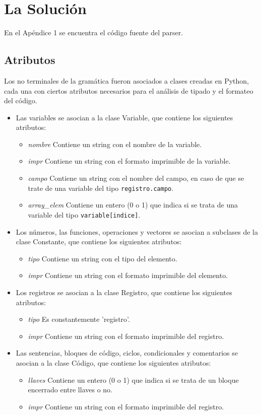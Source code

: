 \section{La Solución}

En el Apéndice 1 se encuentra el código fuente del parser.

\subsection{Atributos}

Los no terminales de la gramática fueron asociados a clases creadas en Python, cada una con ciertos atributos necesarios para el análisis de tipado y el formateo del código.

\begin{itemize}
\item Las variables se asocian a la clase Variable, que contiene los siguientes atributos:
	\begin{itemize}
	\item {\it nombre} Contiene un string con el nombre de la variable.
	\item {\it impr} Contiene un string con el formato imprimible de la variable.
	\item {\it campo} Contiene un string con el nombre del campo, en caso de que se trate de una variable del tipo {\tt registro.campo}.
	\item {\it array_elem} Contiene un entero (0 o 1) que indica si se trata de una variable del tipo {\tt variable[indice]}.
	\end{itemize}
\item Los números, las funciones, operaciones y vectores se asocian a subclases de la clase Constante, que contiene los siguientes atributos:
	\begin{itemize}
	\item {\it tipo} Contiene un string con el tipo del elemento.
	\item {\it impr} Contiene un string con el formato imprimible del elemento.
	\end{itemize}
\item Los registros se asocian a la clase Registro, que contiene los siguientes atributos:
	\begin{itemize}
	\item {\it tipo} Es constantemente 'registro'.
	\item {\it impr} Contiene un string con el formato imprimible del registro.
	\end{itemize}
\item Las sentencias, bloques de código, ciclos, condicionales y comentarios se asocian a la clase Código, que contiene los siguientes atributos:
	\begin{itemize}
	\item {\it llaves} Contiene un entero (0 o 1) que indica si se trata de un bloque encerrado entre llaves o no.
	\item {\it impr} Contiene un string con el formato imprimible del registro.
	\end{itemize}
\end{itemize}


